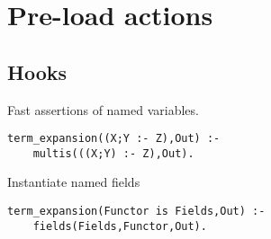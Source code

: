 \section{Pre-load actions
}
\subsection{Hooks
}
 Fast assertions of named variables. 
\begin{Verbatim}
term_expansion((X;Y :- Z),Out) :-
	multis(((X;Y) :- Z),Out).
\end{Verbatim}
Instantiate named fields
\begin{Verbatim}
term_expansion(Functor is Fields,Out) :-
	fields(Fields,Functor,Out).
\end{Verbatim}

